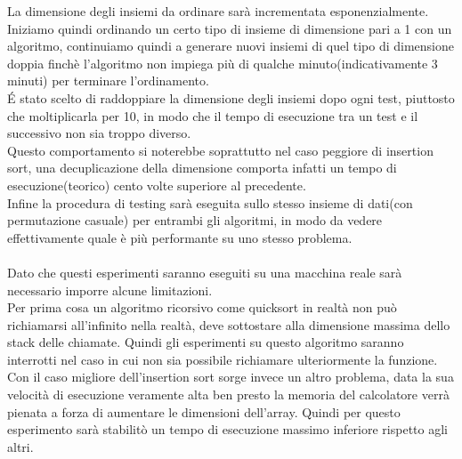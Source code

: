 \documentclass[]{article}
\begin{document}
La dimensione degli insiemi da ordinare sarà incrementata esponenzialmente.\\
Iniziamo quindi ordinando un certo tipo di insieme di dimensione pari a 1 con un algoritmo, continuiamo quindi a generare nuovi insiemi di quel tipo di dimensione doppia finchè l'algoritmo non impiega più di qualche minuto(indicativamente 3 minuti) per terminare l'ordinamento.\\
\'E stato scelto di raddoppiare la dimensione degli insiemi dopo ogni test, piuttosto che moltiplicarla per 10, in modo che il tempo di esecuzione tra un test e il successivo non sia troppo diverso.\\
Questo comportamento si noterebbe soprattutto nel caso peggiore di insertion sort, una decuplicazione della dimensione comporta infatti un tempo di esecuzione(teorico) cento volte superiore al precedente.\\
Infine la procedura di testing sarà eseguita sullo stesso insieme di dati(con permutazione casuale) per entrambi gli algoritmi, in modo da vedere effettivamente quale è più performante su uno stesso problema.\\\\
Dato che questi esperimenti saranno eseguiti su una macchina reale sarà necessario imporre alcune limitazioni.\\
Per prima cosa un algoritmo ricorsivo come quicksort in realtà non può richiamarsi all'infinito nella realtà, deve sottostare alla dimensione massima dello stack delle chiamate. Quindi gli esperimenti su questo algoritmo saranno interrotti nel caso in cui non sia possibile richiamare ulteriormente la funzione.\\
Con il caso migliore dell'insertion sort sorge invece un altro problema, data la sua velocità di esecuzione veramente alta ben presto la memoria del calcolatore verrà pienata a forza di aumentare le dimensioni dell'array. Quindi per questo esperimento sarà stabilitò un tempo di esecuzione massimo inferiore rispetto agli altri.\\
\end{document}
